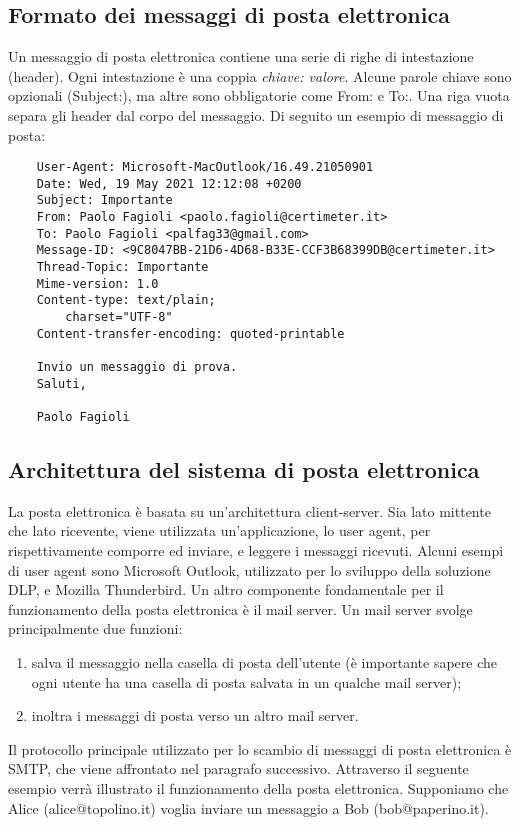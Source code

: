 \subsection{Formato dei messaggi di posta elettronica}
Un messaggio di posta elettronica contiene una serie di righe di intestazione (header).
Ogni intestazione è una coppia \textit{chiave: valore}. Alcune parole chiave sono opzionali (Subject:), 
ma altre sono obbligatorie come From: e To:. Una riga vuota separa gli header dal corpo del messaggio.
Di seguito un esempio di messaggio di posta:

\begin{verbatim}
    User-Agent: Microsoft-MacOutlook/16.49.21050901
    Date: Wed, 19 May 2021 12:12:08 +0200
    Subject: Importante
    From: Paolo Fagioli <paolo.fagioli@certimeter.it>
    To: Paolo Fagioli <palfag33@gmail.com>
    Message-ID: <9C8047BB-21D6-4D68-B33E-CCF3B68399DB@certimeter.it>
    Thread-Topic: Importante
    Mime-version: 1.0
    Content-type: text/plain;
        charset="UTF-8"
    Content-transfer-encoding: quoted-printable

    Invio un messaggio di prova.
    Saluti,

    Paolo Fagioli
\end{verbatim}

\subsection{Architettura del sistema di posta elettronica}
La posta elettronica è basata su un'architettura client-server. 
Sia lato mittente che lato ricevente, viene utilizzata un'applicazione, lo user agent, per rispettivamente 
comporre ed inviare, e leggere i messaggi ricevuti. 
Alcuni esempi di user agent sono Microsoft Outlook, utilizzato per lo sviluppo della soluzione DLP, 
e Mozilla Thunderbird.
Un altro componente fondamentale per il funzionamento della posta elettronica è il mail server. 
Un mail server svolge principalmente due funzioni:

\begin{enumerate}
    \item salva il messaggio nella casella di posta dell'utente (è importante sapere che ogni utente ha una casella di posta salvata in un qualche mail server);
    \item inoltra i messaggi di posta verso un altro mail server.
\end{enumerate}

Il protocollo principale utilizzato per lo scambio di messaggi di posta elettronica è SMTP, 
che viene affrontato nel paragrafo successivo.
Attraverso il seguente esempio verrà illustrato il funzionamento della posta elettronica.
Supponiamo che Alice (alice@topolino.it) voglia inviare un messaggio a Bob (bob@paperino.it).

